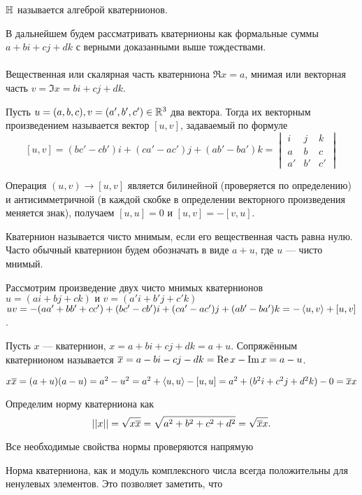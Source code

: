  $\mathbb{H}$ называется алгеброй кватернионов. 
\edfn

В дальнейшем будем рассматривать кватернионы как формальные суммы $a + bi + cj + dk$ с верными доказанными выше тождествами.\\
\\
 Вещественная или скалярная часть кватерниона $\Re x=a$, мнимая или векторная часть $v=\Im x= bi+cj+dk$.\\
\edfn

 Пусть $u = (a,b,c),v = (a',b',c') \in \mathbb{R}^3$ два вектора. Тогда их векторным произведением называется вектор $[u,v]$, задаваемый по формуле $$[u,v]= (bc'-cb')i + (ca'-ac')j + (ab'- ba')k= \begin{vmatrix} i& j&k \\ a & b & c \\ a' & b' & c' \end{vmatrix} $$

\edfn
\rm Операция $(u,v) \to [u,v]$ является билинейной (проверяется по определению) и антисимметричной (в каждой скобке в определении векторного произведения меняется знак), получаем $[u,u]=0$ и $[u,v]=-[v,u]$.
\erm

Кватернион называется чисто мнимым, если его вещественная часть равна нулю. Часто обычный кватернион будем обозначать в виде $a + u$, где $u$ --- чисто мнимый.
\edfn

Рассмотрим произведение двух чисто мнимых кватернионов $u = (ai + bj + ck) \text{ и } v = (a'i + b'j + c'k)$\\
$uv = -(aa' + bb' + cc') + (bc' - cb') i + (ca' - ac')j + (ab' - ba')k =
-\left\langle u,v\right\rangle+[u,v]$.

 Пусть $x$ --- кватернион, $x= a+bi+cj+dk = a + u$. Сопряжённым кватернионом называется $\overline{x}= a-bi-cj-dk= \operatorname{Re} x - \operatorname{Im} x =a-u$. 
\edfn

\rm
$x \overline{x} = (a + u) (a - u) = a^2 - u^2 = a^2 + \left\langle u, u \right\rangle - [u, u] = a^2 + (b^2 i + c^2 j + d^2 k) - 0 = \overline{x} x$
\erm

 Определим норму кватерниона как $$||x||=\sqrt{x\overline{x}}=\sqrt{ a^2+b^2+c^2+d^2}=\sqrt{\overline{x}x}.$$
\edfn 

\rm 
   Все необходимые свойства нормы проверяются напрямую
\erm 

Норма кватерниона, как и модуль комплексного числа всегда положительны для ненулевых элементов. Это позволяет заметить, что


